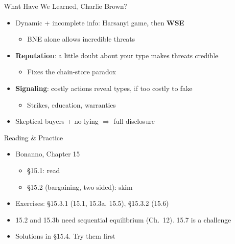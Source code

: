 \begin{frame}{What Have We Learned, Charlie Brown?}
\begin{itemize}
    \item Dynamic + incomplete info: Harsanyi game, then \textbf{WSE}
    \begin{itemize}
        \item BNE alone allows incredible threats
    \end{itemize}
    \item \textbf{Reputation}: a little doubt about your type makes threats credible
    \begin{itemize}
        \item Fixes the chain-store paradox
    \end{itemize}
    \item \textbf{Signaling}: costly actions reveal types, if too costly to fake
    \begin{itemize}
        \item Strikes, education, warranties
    \end{itemize}
    \item Skeptical buyers + no lying $\Rightarrow$ full disclosure
\end{itemize}
\vfill
\vspace{-0.4in}
\end{frame}

\begin{frame}{Reading \& Practice}
\begin{itemize}
    \item Bonanno, Chapter 15
    \begin{itemize}
        \item \S15.1: read
        \item \S15.2 (bargaining, two-sided): skim
    \end{itemize}
    \item Exercises: \S15.3.1 (15.1, 15.3a, 15.5), \S15.3.2 (15.6)
    \item 15.2 and 15.3b need sequential equilibrium (Ch.~12). 15.7 is a challenge
    \item Solutions in \S15.4. Try them first
\end{itemize}
\vfill
\end{frame}



